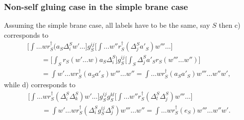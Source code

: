 \documentclass[11pt]{article}
\def\idagger{r^{\dagger}}
\def\res{r}
\begin{document}
\subsubsection{Non-self gluing case in the simple brane case}

Assuming the simple brane case, all labels have to be the same, say
$S$ then c) corresponds to
\begin{gather*}
\bigg[\int \dots w  \idagger_{S}(a_S \Delta^{S}_i  w'\dots\bigg]  g^{ij}_{S}
\bigg[\int  \dots w'' \idagger_S (\Delta_j^{S}a'_S) w''' \dots\bigg]  \\
\qquad{} = \bigg[\int_S \res _S (w' \dots w) a_S \Delta^{S}_i \bigg] g^{ij}_{S}
\bigg[\int_S  \Delta_j^{S}a'_S \res_S( w''' \dots w'')\bigg]\\
\qquad{} = \int w' \dots w \idagger_S (a_S a'_S)  w''' \dots w''
 =  \int \dots w \idagger_S(a_S a'_S)  w'''  \dots w'' w',
\end{gather*}
while d) corresponds to
\begin{gather*}
\bigg[\int \dots w  \idagger_{S}(\Delta^{S}_i  \Delta^{S}_{k}) w'\dots \bigg] g^{ij}_{S}g^{kl}_{S}
 \bigg[\int  \dots w'' \idagger_{S}( \Delta_l^{S} \Delta_j^{S}) w''' \dots \bigg]  \\
\qquad{} = \int w' \dots w \idagger_S (\Delta_i^S g_S^{ij}\Delta_j^S)  w''' \dots w''
 = \int \dots w \idagger_S(e_S)  w'''  \dots w'' w'.
\end{gather*}
\end{document}
